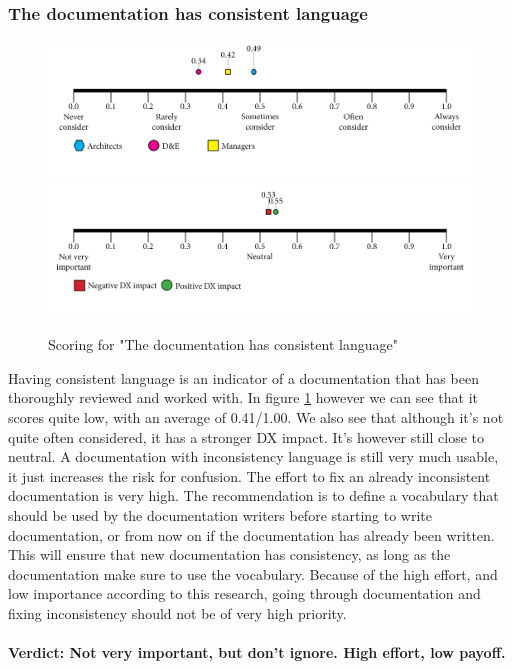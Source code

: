 \documentclass{article}
\begin{document}
\subsubsection{The documentation has consistent language}
\begin{figure}[H]
\centering
\includegraphics[width=\linewidth]{scorelines/aspect6.png}
\includegraphics[width=\linewidth]{dxscorelines/dxaspect6.png}
\caption{Scoring for "The documentation has consistent language"}
\label{fig:aspect6}
\end{figure}
Having consistent language is an indicator of a documentation that has been thoroughly reviewed and worked with. In figure \ref{fig:aspect6} however we can see that it scores quite low, with an average of 0.41/1.00. We also see that although it's not quite often considered, it has a stronger DX impact. It's however still close to neutral. A documentation with inconsistency language is still very much usable, it just increases the risk for confusion. The effort to fix an already inconsistent documentation is very high. The recommendation is to define a vocabulary that should be used by the documentation writers before starting to write documentation, or from now on if the documentation has already been written. This will ensure that new documentation has consistency, as long as the documentation make sure to use the vocabulary. Because of the high effort, and low importance according to this research, going through documentation and fixing inconsistency should not be of very high priority.\\ \\
\textbf{Verdict: Not very important, but don't ignore. High effort, low payoff.}
\end{document}
